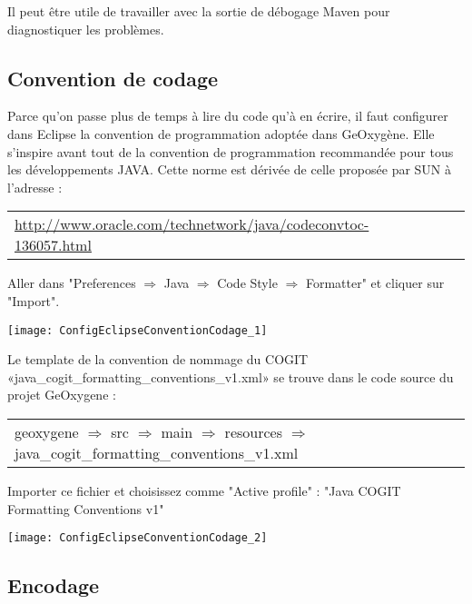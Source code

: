Il peut être utile de travailler avec la sortie de débogage Maven pour diagnostiquer les problèmes.




\subsection{Convention de codage}

Parce qu'on passe plus de temps à lire du code qu’à en écrire, il faut configurer dans Eclipse la convention de programmation adoptée dans GeOxygène. Elle s'inspire avant tout de la convention de programmation recommandée pour tous les développements JAVA. Cette norme est dérivée de celle proposée par SUN à l’adresse :

\begin{tabular}[!t]{llll}
{\href{http://www.oracle.com/technetwork/java/codeconvtoc-136057.html}{http://www.oracle.com/technetwork/java/codeconvtoc-136057.html}}  
\end{tabular}

\noindent
Aller dans "Preferences $\Rightarrow$ Java $\Rightarrow$ Code Style $\Rightarrow$ Formatter" et cliquer sur "Import". 

\begin{center}
\texttt{[image: ConfigEclipseConventionCodage\_1]}
\end{center}

\noindent
Le template de la convention de nommage du COGIT «java\_cogit\_formatting\_conventions\_v1.xml» se trouve dans le code source du projet GeOxygene :

\begin{tabular}[!t]{llll}
geoxygene $\Rightarrow$  src $\Rightarrow$  main $\Rightarrow$  resources $\Rightarrow$  java\_cogit\_formatting\_conventions\_v1.xml
\end{tabular}

\smallskip

\noindent
Importer ce fichier et choisissez comme "Active profile" : "Java COGIT Formatting Conventions v1" 

\begin{center}
\texttt{[image: ConfigEclipseConventionCodage\_2]}
\end{center}


\subsection{Encodage}

